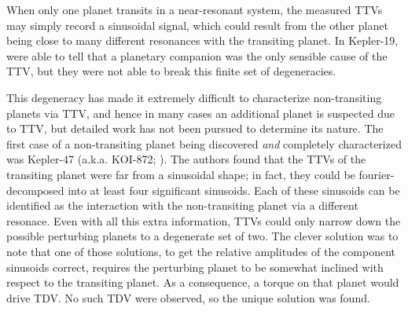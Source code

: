 \documentclass[graybox,natbib,nosecnum]{svmult}
\begin{document}

When only one planet transits in a near-resonant system, the measured TTVs may simply record a sinusoidal signal, which could result from the other planet being close to many different resonances with the transiting planet.  In Kepler-19, \cite{2011ApJ...743..200B} were able to tell that a planetary companion was the only sensible cause of the TTV, but they were not able to break this finite set of degeneracies. 

This degeneracy has made it extremely difficult to characterize non-transiting planets via TTV, and hence in many cases an additional planet is suspected due to TTV, but detailed work has not been pursued to determine its nature.  The first case of a non-transiting planet being discovered \emph{and} completely characterized was Kepler-47 (a.k.a. KOI-872; \citealt{2012Sci...336.1133N}).  The authors found that the TTVs of the transiting planet were far from a sinusoidal shape; in fact, they could be fourier-decomposed into at least four significant sinusoids.  Each of these sinusoids can be identified as the interaction with the non-transiting planet via a different resonace.  Even with all this extra information, TTVs could only narrow down the possible perturbing planets to a degenerate set of two.  The clever solution \citep{2012Sci...336.1133N} was to note that one of those solutions, to get the relative amplitudes of the component sinusoids correct,  requires the perturbing planet to be somewhat inclined with respect to the transiting planet.  As a consequence, a torque on that planet would drive TDV.  No such TDV were observed, so the unique solution was found. 
\end{document}
